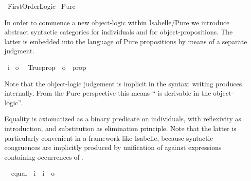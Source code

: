 %
\begin{isabellebody}%
\def\isabellecontext{First{\isacharunderscore}Order{\isacharunderscore}Logic}%
%
\isamarkuptrue%
%
\isadelimvisible
%
\endisadelimvisible
%
\isatagvisible
{}\isamarkupfalse%
\ First{\isacharunderscore}Order{\isacharunderscore}Logic\isanewline
{}\ Pure\isanewline
{}%
\endisatagvisible
{\isafoldvisible}%
%
\isadelimvisible
%
\endisadelimvisible
%
\begin{isamarkuptext}%
In order to commence a new object-logic within Isabelle/Pure we
  introduce abstract syntactic categories  for individuals
  and  for object-propositions.  The latter is embedded
  into the language of Pure propositions by means of a separate
  judgment.%
\end{isamarkuptext}%
\isamarkuptrue%
\isamarkupfalse%
\ i\isanewline
{}\isamarkupfalse%
\ o\isanewline
\isanewline
{}\isamarkupfalse%
\isanewline
\ \ Trueprop\ {\isacharcolon}{\isacharcolon}\ {\isachardoublequoteopen}o\ {\isasymRightarrow}\ prop{\isachardoublequoteclose}\ \ \ \ {\isacharparenleft}{\isachardoublequoteopen}{\isacharunderscore}{\isachardoublequoteclose}\ {}{\isacharparenright}%
\begin{isamarkuptext}%
\noindent Note that the object-logic judgement is implicit in the
  syntax: writing  produces  internally.
  From the Pure perspective this means `` is derivable in the
  object-logic''.%
\end{isamarkuptext}%
\isamarkuptrue%
%
\isamarkuptrue%
%
\begin{isamarkuptext}%
Equality is axiomatized as a binary predicate on individuals, with
  reflexivity as introduction, and substitution as elimination
  principle.  Note that the latter is particularly convenient in a
  framework like Isabelle, because syntactic congruences are
  implicitly produced by unification of  against
  expressions containing occurrences of .%
\end{isamarkuptext}%
\isamarkuptrue%
\isamarkupfalse%
\isanewline
\ \ equal\ {\isacharcolon}{\isacharcolon}\ {\isachardoublequoteopen}i\ {\isasymRightarrow}\ i\ {\isasymRightarrow}\ o{\isachardoublequoteclose}\ \ {\isacharparenleft}\ {\isachardoublequoteopen}{\isacharequal}{\isachardoublequoteclose}\ {}{}{\isacharparenright}\isanewline

\end{isabellebody}
